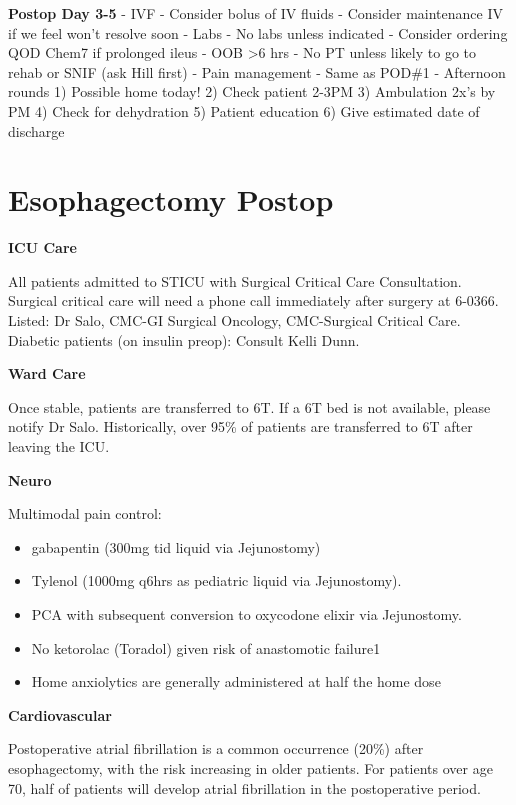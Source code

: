 \documentclass[
]{book}
\providecommand{\tightlist}{%
  \setlength{\itemsep}{0pt}\setlength{\parskip}{0pt}}
\begin{document}
\textbf{Postop Day 3-5}
- IVF
- Consider bolus of IV fluids
- Consider maintenance IV if we feel won't resolve soon
- Labs
- No labs unless indicated
- Consider ordering QOD Chem7 if prolonged ileus
- OOB \textgreater6 hrs
- No PT unless likely to go to rehab or SNIF (ask Hill first)
- Pain management
- Same as POD\#1
- Afternoon rounds
1) Possible home today!
2) Check patient 2-3PM
3) Ambulation 2x's by PM
4) Check for dehydration
5) Patient education
6) Give estimated date of discharge

\hypertarget{esophagectomy-postop}{%
\chapter{Esophagectomy Postop}\label{esophagectomy-postop}}

\textbf{ICU Care}

All patients admitted to STICU with Surgical Critical Care Consultation. Surgical critical care will need a phone call immediately after surgery at 6-0366. Listed: Dr Salo, CMC-GI Surgical Oncology, CMC-Surgical Critical Care. Diabetic patients (on insulin preop): Consult Kelli Dunn.

\textbf{Ward Care}

Once stable, patients are transferred to 6T. If a 6T bed is not available, please notify Dr Salo. Historically, over 95\% of patients are transferred to 6T after leaving the ICU.

\textbf{Neuro}

Multimodal pain control:

\begin{itemize}
\tightlist
\item
  gabapentin (300mg tid liquid via Jejunostomy)
\item
  Tylenol (1000mg q6hrs as pediatric liquid via Jejunostomy).
\item
  PCA with subsequent conversion to oxycodone elixir via Jejunostomy.
\item
  No ketorolac (Toradol) given risk of anastomotic failure\hspace{0pt}1\hspace{0pt}
\item
  Home anxiolytics are generally administered at half the home dose
\end{itemize}

\textbf{Cardiovascular}

Postoperative atrial fibrillation is a common occurrence (20\%) after esophagectomy, with the risk increasing in older patients. For patients over age 70, half of patients will develop atrial fibrillation in the postoperative period.
\end{document}
